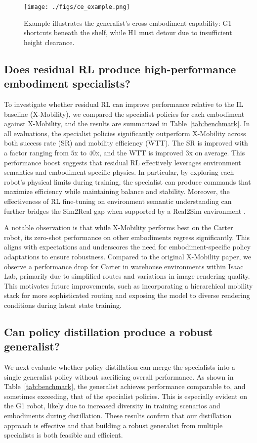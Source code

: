 \documentclass[letterpaper, 10 pt,conference]{ieeeconf}
\begin{document}
\begin{figure}[t] 
\begin{center} \centering\texttt{[image: ./figs/ce\_example.png]} 
\caption{Example illustrates the generalist's cross-embodiment capability: G1 shortcuts beneath the shelf, while H1 must detour due to insufficient height clearance.} 
\label{fig:ce_example} 
\end{center} 
\end{figure}

\subsection{Does residual RL produce high-performance embodiment specialists?} 
To investigate whether residual RL can improve performance relative to the IL baseline (X-Mobility), we compared the specialist policies for each embodiment against X-Mobility, and the results are summarized in Table~\ref{tab:benchmark}. In all evaluations, the specialist policies significantly outperform X-Mobility across both success rate (SR) and mobility efficiency (WTT). The SR is improved with a factor ranging from $5$x to $40$x, and the WTT is improved $3$x on average. This performance boost suggests that residual RL effectively leverages environment semantics and embodiment-specific physics. In particular, by exploring each robot’s physical limits during training, the specialist can produce commands that maximize efficiency while maintaining balance and stability. Moreover, the effectiveness of RL fine-tuning on environment semantic understanding can further bridges the Sim2Real gap when supported by a Real2Sim environment \cite{zhu2025vr}. 

A notable observation is that while X-Mobility performs best on the Carter robot, its zero-shot performance on other embodiments regress significantly. This aligns with expectations and underscores the need for embodiment-specific policy adaptations to ensure robustness. Compared to the original X-Mobility paper, we observe a performance drop for Carter in warehouse environments within Isaac Lab, primarily due to simplified routes and variations in image rendering quality. This motivates future improvements, such as incorporating a hierarchical mobility stack for more sophisticated routing and exposing the model to diverse rendering conditions during latent state training.

\subsection{Can policy distillation produce a robust generalist?} 
We next evaluate whether policy distillation can merge the specialists into a single generalist policy without sacrificing overall performance. As shown in Table~\ref{tab:benchmark}, the generalist achieves performance comparable to, and sometimes exceeding, that of the specialist policies. This is especially evident on the G1 robot, likely due to increased diversity in training scenarios and embodiments during distillation. These results confirm that our distillation approach is effective and that building a robust generalist from multiple specialists is both feasible and efficient.
\end{document}
